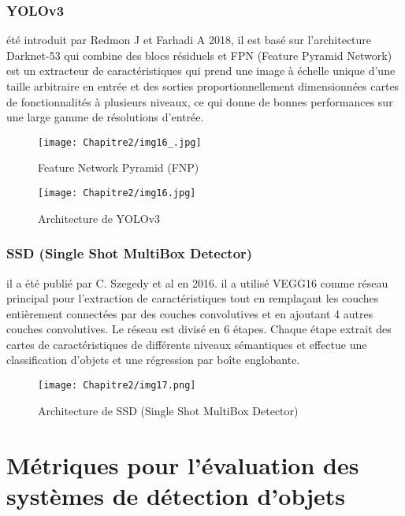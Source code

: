      \subsubsection{YOLOv3} \cite{yolov3_paper}
     été introduit par Redmon J et Farhadi A 2018, il est basé sur l'architecture Darknet-53 qui combine des blocs résiduels et FPN (Feature Pyramid Network) est un extracteur de caractéristiques qui prend une image à échelle unique d'une taille arbitraire en entrée et des sorties proportionnellement dimensionnées cartes de fonctionnalités à plusieurs niveaux, ce qui donne de bonnes performances sur une large gamme de résolutions d'entrée.
     \begin{figure}[H]
          \centering
          \texttt{[image: Chapitre2/img16\_.jpg]}
          \caption{Feature Network Pyramid (FNP)}
          \label{img16_}
          \end{figure}
     \begin{figure}[H]
          \centering
          \texttt{[image: Chapitre2/img16.jpg]}
          \caption{Architecture de YOLOv3}
          \label{img16}
          \end{figure}
     
          
     \subsubsection{SSD (Single Shot MultiBox Detector)} \cite{ssd_paper}
     il a été publié par C. Szegedy et al en 2016. il a utilisé VEGG16 comme réseau principal pour l'extraction de caractéristiques tout en remplaçant les couches entièrement connectées par des couches convolutives et en ajoutant 4 autres couches convolutives. Le réseau est divisé en 6 étapes. Chaque étape extrait des cartes de caractéristiques de différents niveaux sémantiques et effectue une classification d'objets et une régression par boîte englobante.
     \begin{figure}[H]
          \centering
          \texttt{[image: Chapitre2/img17.png]}
          \caption{Architecture de SSD (Single Shot MultiBox Detector)}
          \label{img17}
          \end{figure}

\section{Métriques pour l'évaluation des systèmes de détection d'objets} 
